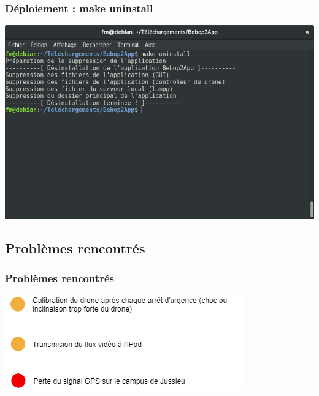 \documentclass{beamer}
\begin{document}
    \begin{frame}
		\begin{center}
		\frametitle{Déploiement : make uninstall}
        \includegraphics[scale=0.4]{make_uninstall.png}
		\end{center}
	\end{frame}



	
	\begin{frame}
	\section{Problèmes rencontrés}
		\begin{center}
		\frametitle{Problèmes rencontrés}
        \includegraphics[scale=0.75]{problemes.png}
		\end{center}
	\end{frame}
\end{document}
